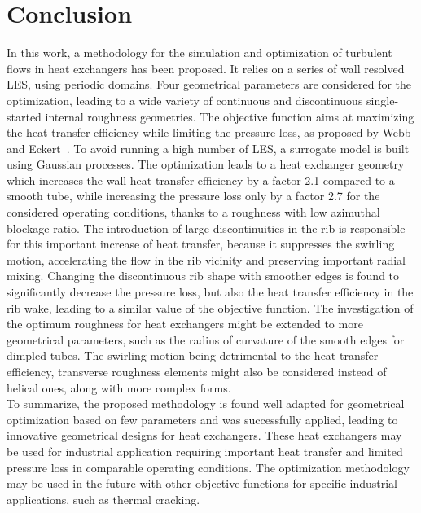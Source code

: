 \section{Conclusion}\label{sec:optim_ccl}
In this work, a methodology for the simulation and optimization of turbulent flows in heat exchangers has been proposed. It relies on a series of wall resolved LES, using periodic domains. Four geometrical parameters are considered for the optimization, leading to a wide variety of continuous and discontinuous single-started internal roughness geometries. The objective function aims at maximizing the heat transfer efficiency while limiting the pressure loss, as proposed by Webb and Eckert~\cite{webb1972}. To avoid running a high number of LES, a surrogate model is built using Gaussian processes. The optimization leads to a heat exchanger geometry which increases the wall heat transfer efficiency by a factor 2.1 compared to a smooth tube, while increasing the pressure loss only by a factor 2.7 for the considered operating conditions, thanks to a roughness with low azimuthal blockage ratio. The introduction of large discontinuities in the rib is responsible for this important increase of heat transfer, because it suppresses the swirling motion, accelerating the flow in the rib vicinity and preserving important radial mixing. Changing the discontinuous rib shape with smoother edges is found to significantly decrease the pressure loss, but also the heat transfer efficiency in the rib wake, leading to a similar value of the objective function. The investigation of the optimum roughness for heat exchangers might be extended to more geometrical parameters, such as the radius of curvature of the smooth edges for dimpled tubes. The swirling motion being detrimental to the heat transfer efficiency, transverse roughness elements might also be considered instead of helical ones, along with more complex forms.\\

To summarize, the proposed methodology is found well adapted for geometrical optimization based on few parameters and was successfully applied, leading to innovative geometrical designs for heat exchangers. These heat exchangers may be used for industrial application requiring important heat transfer and limited pressure loss in comparable operating conditions. The optimization methodology may be used in the future with other objective functions for specific industrial applications, such as thermal cracking.\\ 


